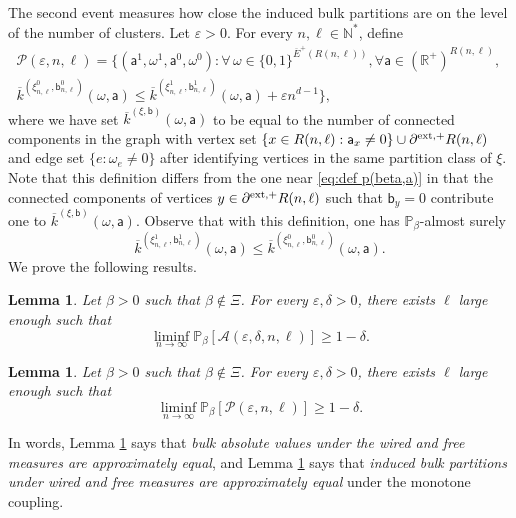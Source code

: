 \documentclass[11pt,a4paper]{article}
\numberwithin{equation}{section}
\theoremstyle{plain}
\newtheorem{Lem}[Thm]{Lemma}
\theoremstyle{definition}
\begin{document}
The second event measures how close the induced bulk partitions are on the level of the number of clusters. Let $\varepsilon > 0$. For every $n, \ell \in \mathbb N^*$, define
\begin{multline}
\mathcal P(\varepsilon, n,\ell) = \Big\{ (\mathsf a^1, \omega^1, \mathsf a^0, \omega^0) : \forall \, \omega \in \{0,1\}^{\overline E^+(R(n,\ell))},\forall \mathsf{a}\in (\mathbb{R}^+)^{R(n,\ell)}, \,  
\\
\overline{k}^{(\xi^0_{n,\ell},\mathsf{b}^0_{n,\ell})}(\omega,\mathsf{a}) \leq \overline{k}^{(\xi^1_{n,\ell},\mathsf{b}^1_{n,\ell})}(\omega,\mathsf{a}) + \varepsilon n^{d-1} \Big\}, 
\end{multline}
where we have set $\overline{k}^{(\xi,\mathsf{b})}(\omega,\mathsf{a})$ to be equal to the number of connected components in the graph with vertex set $\{x\in R(n,\ell): \mathsf{a}_x\neq 0\}\cup \partial^{\textup{ext},+}R(n,\ell)$ and edge set $\{e: \omega_e\neq 0\}$ after identifying vertices in the same partition class of $\xi$. Note that this definition differs from the one near \eqref{eq:def p(beta,a)} in that the connected components of vertices $y\in \partial^{\rm{ext},+}R(n,\ell)$ such that $\mathsf{b}_y=0$ contribute one to $\overline{k}^{(\xi,\mathsf{b})}(\omega,\mathsf{a})$. Observe that with this definition, one has $\mathbb{P}_{\beta}$-almost surely
\begin{equation}\label{eq: k bar are ordered}
    \overline{k}^{(\xi^1_{n,\ell},\mathsf{b}^1_{n,\ell})}(\omega,\mathsf{a})\leq   \overline{k}^{(\xi^0_{n,\ell},\mathsf{b}^0_{n,\ell})}(\omega,\mathsf{a}).
\end{equation}
We prove the following results.
\begin{Lem}\label{lem:abs value approx}
Let $\beta >0$ such that $\beta \not\in \Xi$. For every $\varepsilon,\delta > 0$, there exists $\ell$ large enough such that
\begin{equation}
\liminf_{n \rightarrow \infty} \mathbb P_{\beta}[\mathcal A(\varepsilon,\delta,n, \ell)] \geq 1-\delta.
\end{equation}
\end{Lem}
\begin{Lem}\label{lem:partitions approx}
Let $\beta >0$ such that $\beta \not\in \Xi$. For every $\varepsilon, \delta > 0$, there exists $\ell$ large enough such that
\begin{equation}
\liminf_{n \rightarrow \infty} \mathbb P_\beta[\mathcal P(\varepsilon,n,\ell)] \geq 1-\delta. 
\end{equation}
\end{Lem}
In words, Lemma \ref{lem:abs value approx} says that \emph{bulk absolute values under the wired and free measures are approximately equal}, and Lemma \ref{lem:partitions approx} says that \emph{induced bulk partitions under wired and free measures are approximately equal} under the monotone coupling.
\end{document}
